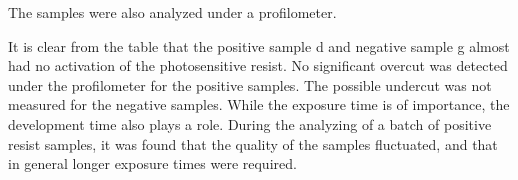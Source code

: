 The samples were also analyzed under a profilometer.

%



It is clear from the table that the positive sample d and negative sample g almost had no activation of the photosensitive resist. No significant overcut was detected under the profilometer for the positive samples. The possible undercut was not measured for the negative samples.
While the exposure time is of importance, the development time also plays a role. During the analyzing of a batch of positive resist samples, it was found that the quality of the samples fluctuated, and that in general longer exposure times were required. 


